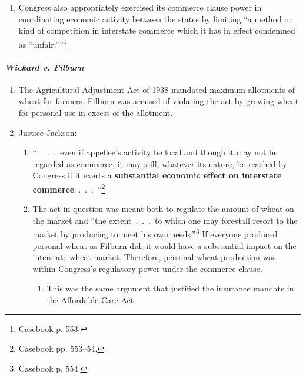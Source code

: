 \begin{enumerate}
\begin{enumerate}
        the prohibited product, but also to ``stop the initial step toward 
        transportation, production with the purpose of so transporting 
        it.''\footnote{Casebook p. 552.} Such regulation was within Congress's 
        power.
        \item Congress also appropriately exercised its commerce clause power 
        in coordinating economic activity between the states by limiting ``a 
        method or kind of competition in interstate commerce which it has in 
        effect condemned as \enquote{unfair.}''\footnote{Casebook p. 553.}
    \end{enumerate}
\end{enumerate}

\paragraph{\emph{Wickard v. Filburn}}

\begin{enumerate}
    \item The Agricultural Adjustment Act of 1938 mandated maximum allotments 
    of wheat for farmers. Filburn was accused of violating the act by growing 
    wheat for personal use in excess of the allotment.
    \item Justice Jackson:
    \begin{enumerate}
        \item ``~.~.~.~even if appellee's activity be local and though it may 
        not be regarded as commerce, it may still, whatever its nature, be 
        reached by Congress if it exerts a \textbf{substantial economic effect 
        on interstate commerce}~.~.~.~''\footnote{Casebook pp. 553--54.}
        \item The act in question was meant both to regulate the amount of 
        wheat on the market and ``the extent~.~.~.~to which one may forestall 
        resort to the market by producing to meet his own 
        needs.''\footnote{Casebook p. 554.} If everyone produced personal 
        wheat as Filburn did, it would have a substantial impact on the 
        interstate wheat market. Therefore, personal wheat production was 
        within Congress's regulatory power under the commerce clause.
        \begin{enumerate}
                \item This was the same argument that justified the insurance 
                mandate in the Affordable Care Act.
        \end{enumerate}
    \end{enumerate}
\end{enumerate}

